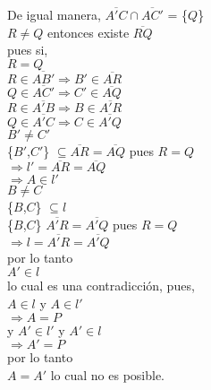 \documentclass[12pt]{book}
\theoremstyle{definition}
\begin{document}
    De igual manera,
    $\overline{A'C} \cap \overline{AC'}$ = \{$Q$\}\\
    $R \neq Q$ entonces existe $\overline{RQ}$\\

    pues si,\\
    $R=Q$\\
    $R \in \overline{AB'} \Rightarrow B' \in \overline{AR}$\\
    $Q \in \overline{AC'} \Rightarrow C' \in \overline{AQ}$\\
    $R \in \overline{A'B} \Rightarrow B \in \overline{A'R}$\\
    $Q \in \overline{A'C} \Rightarrow C \in \overline{A'Q}$\\

    $B' \neq C'$\\
    \{$B'$,$C'$\} $\subseteq \overline{AR} = \overline{AQ}$ pues $R=Q$\\
    $\Rightarrow l' = \overline{AR} = \overline{AQ}$\\
    $\Rightarrow A \in l'$\\

    $B \neq C$\\
    \{$B$,$C$\} $\subseteq l$\\
    \{$B$,$C$\} $\overline{A'R} = \overline{A'Q}$ pues $R=Q$\\
    $\Rightarrow l = \overline{A'R} = \overline{A'Q}$\\
      por lo tanto\\
      $A' \in l$\\
    lo cual es una contradicción, pues,\\
    $A \in l$ y $A \in l'$\\
    $\Rightarrow A = P$\\
    y $A' \in l'$ y $A' \in l$\\
    $\Rightarrow A' = P$\\
    por lo tanto\\
    $A = A'$ lo cual no es posible.
    

  

    
\end{document}
